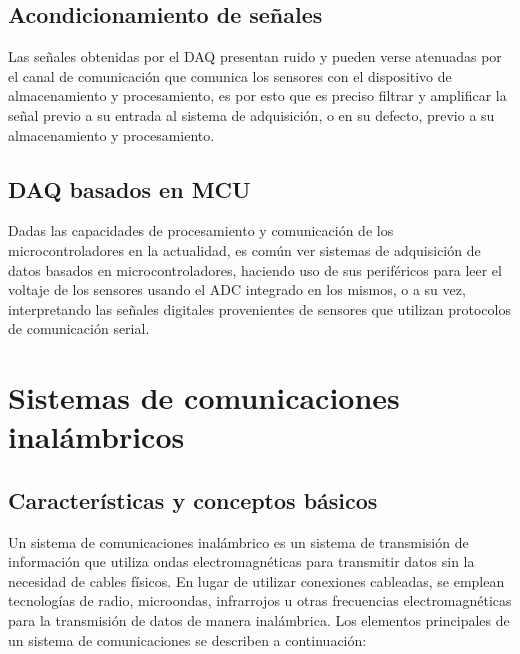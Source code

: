 \subsection{Acondicionamiento de señales} Las señales obtenidas por el DAQ presentan ruido y pueden verse atenuadas por el canal de comunicación que comunica los sensores con el dispositivo de almacenamiento y procesamiento, es por esto que es preciso filtrar y amplificar la señal previo a su entrada al sistema de adquisición, o en su defecto, previo a su almacenamiento y procesamiento.

\subsection{DAQ basados en MCU} Dadas las capacidades de procesamiento y comunicación de los microcontroladores en la actualidad, es común ver sistemas de adquisición de datos basados en microcontroladores, haciendo uso de sus periféricos para leer el voltaje de los sensores usando el ADC integrado en los mismos, o a su vez, interpretando las señales digitales provenientes de sensores que utilizan protocolos de comunicación serial.


\section{Sistemas de comunicaciones inalámbricos}

\subsection{Características y conceptos básicos}

Un sistema de comunicaciones inalámbrico es un sistema de transmisión de información que utiliza ondas electromagnéticas para transmitir datos sin la necesidad de cables físicos. En lugar de utilizar conexiones cableadas, se emplean tecnologías de radio, microondas, infrarrojos u otras frecuencias electromagnéticas para la transmisión de datos de manera inalámbrica. Los elementos principales de un sistema de comunicaciones se describen a continuación:

